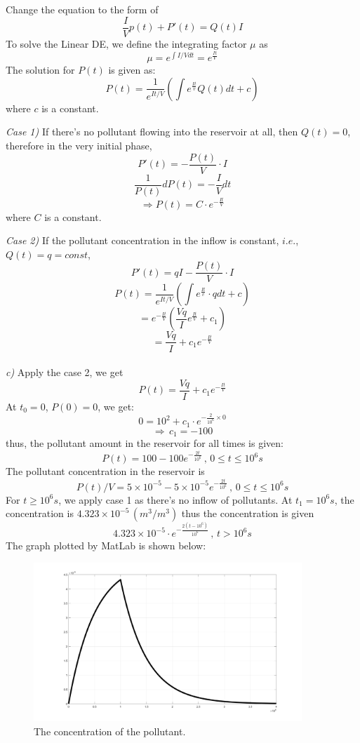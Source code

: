 \documentclass{article}
\begin{document}
Change the equation to the form of
$$\frac{I}{V}p(t)+P'(t)=Q(t)I$$
To solve the Linear DE, we define the integrating factor $\mu$ as
$$\mu=e^{\int I/Vdt}=e^{\frac{It}{V}}$$
The solution for $P(t)$ is given as:
$$P(t)=\frac{1}{e^{It/V}}(\int e^{\frac{It}{v}}Q(t)dt+c)$$
where $c$ is a constant.
\\
\par
\textit{Case 1)}\,\,If there's no pollutant flowing into the reservoir at all, then $Q(t)=0$, therefore in the very initial phase,
$$P'(t)=-\frac{P(t)}{V}\cdot I$$
$$\frac{1}{P(t)}dP(t)=-\frac{I}{V}dt$$
$$\Rightarrow P(t)=C\cdot e^{-\frac{It}{V}}$$
where $C$ is a constant.
\\
\par
\textit{Case 2)}\,\,If the pollutant concentration in the inflow is constant, $i.e.$, $Q(t)=q=const$,
$$P'(t)=qI-\frac{P(t)}{V}\cdot I$$
$$P(t)=\frac{1}{e^{It/V}}(\int e^{\frac{It}{v}}\cdot qdt+c)$$
$$=e^{-\frac{It}{V}}(\frac{Vq}{I}e^{\frac{It}{V}}+c_1)$$
$$=\frac{Vq}{I}+c_1e^{-\frac{It}{V}}$$
\\
\textit{c)}\,\,Apply the case 2, we get
$$P(t)=\frac{Vq}{I}+c_1e^{-\frac{It}{V}}$$
At $t_0=0$, $P(0)=0$, we get:
$$0=10^2+c_1\cdot e^{-\frac{2}{10^6}\times 0}$$
$$\Rightarrow\,c_1=-100$$
thus, the pollutant amount in the reservoir for all times is given:
$$P(t)=100-100e^{-\frac{2t}{10^6}}\,,\,0\leq t\leq 10^6s$$
The pollutant concentration in the reservoir is
$$P(t)/V=5\times 10^{-5}-5\times 10^{-5}e^{-\frac{2t}{10^6}}\,,\,0\leq t\leq 10^6s$$
For $t\geq 10^6s$, we apply case 1 as there's no inflow of pollutants.
At $t_1=10^6s$, the concentration is $4.323\times 10^{-5}\,(m^3/m^3)$
thus the concentration is given
$$4.323\times 10^{-5}\cdot e^{-\frac{2(t-10^6)}{10^6}}\,,\,t>10^6s$$
The graph plotted by MatLab is shown below:
\begin{figure}
  \centering
  \includegraphics[width=0.9\textwidth]{ass1.jpg} 
  \caption{The concentration of the pollutant.} 
  \label{img} 
\end{figure}
\end{document}
